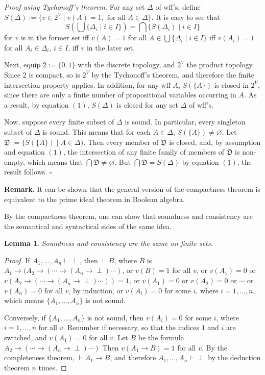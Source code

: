\documentclass[12pt]{article}
\newtheorem{lem}{Lemma}
\begin{document}
\textit{Proof using Tychonoff's theorem}.
For any set $\Delta$ of wff's, define $S(\Delta):=\lbrace v\in 2^V \mid v(A)=1, \mbox{ for all } A \in \Delta \rbrace$.  It is easy to see that 
\begin{equation}
S(\bigcup \lbrace \Delta_i \mid i\in I\rbrace) = \bigcap \lbrace S(\Delta_i) \mid i\in I\rbrace
\end{equation}
for $v$ is in the former set iff $v(A)=1$ for all $A\in \bigcup \lbrace \Delta_i \mid i\in I\rbrace$ iff $v(A_i)=1$ for all $A_i\in \Delta_i$, $i\in I$, iff $v$ in the later set.

Next, equip $2:=\lbrace 0,1\rbrace$ with the discrete topology, and $2^V$ the product topology.  Since $2$ is compact, so is $2^V$ by the Tychonoff's theorem, and therefore the finite intersection property applies.  In addition, for any wff $A$, $S(\lbrace A\rbrace)$ is closed in $2^V$, since there are only a finite number of propositional variables occurring in $A$.  As a result, by equation $(1)$, $S(\Delta)$ is closed for any set $\Delta$ of wff's.

Now, suppose every finite subset of $\Delta$ is sound.  In particular, every singleton subset of $\Delta$ is sound.  This means that for each $A\in \Delta$, $S(\lbrace A\rbrace)\ne \varnothing$.  Let $\mathfrak{D}:=\lbrace S(\lbrace A\rbrace) \mid A \in \Delta)$.  Then every member of $\mathfrak{D}$ is closed, and, by assumption and equation $(1)$, the intersection of any finite family of members of $\mathfrak{D}$ is non-empty, which means that $\bigcap \mathfrak{D} \ne \varnothing$.  But $\bigcap \mathfrak{D} = S(\Delta)$ by equation $(1)$, the result follows.
\hfill $\square$

\textbf{Remark}.  It can be shown that the general version of the compactness theorem is equivalent to the prime ideal theorem in Boolean algebra.

By the compactness theorem, one can show that soundness and consistency are the semantical and syntactical sides of the same idea.

\begin{lem} Soundness and consistency are the same on finite sets. \end{lem}
\begin{proof} If $A_1,\ldots,A_n\vdash \perp$, then $\vdash B$, where $B$ is $A_1 \to (A_2 \to (\cdots \to (A_n \to \perp) \cdots )$, or $v(B)=1$ for all $v$, or $v(A_1)=0$ or $v(A_2 \to (\cdots \to (A_n \to \perp ) \cdots)) = 1$, or $v(A_1)=0$ or $v(A_2)=0$ or $\cdots$ or $v(A_n)=0$ for all $v$, by induction, or $v(A_i)=0$ for some $i$, where $i=1,\ldots, n$, which means $\lbrace A_1, \ldots, A_n \rbrace$ is not sound.

Conversely, if $\lbrace A_1, \ldots, A_n \rbrace$ is not sound, then $v(A_i)=0$ for some $i$, where $i=1,\ldots, n$ for all $v$.  Renumber if necessary, so that the indices $1$ and $i$ are switched, and $v(A_1)=0$ for all $v$.  Let $B$ be the formula $A_2 \to (\cdots \to (A_n \to \perp)\cdots)$  Then $v(A_1\to B)=1$ for all $v$.  By the completeness theorem, $\vdash A_1 \to B$, and therefore $A_1,\ldots, A_n\vdash \perp$ by the deduction theorem $n$ times.
\end{proof}
\end{document}
